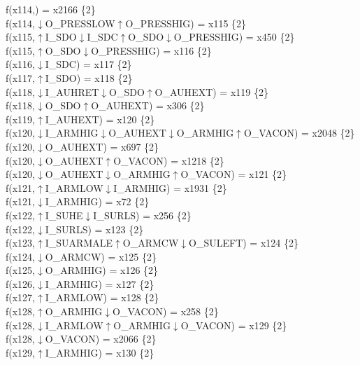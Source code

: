 f(x114,) = x2166 \{2\} \\  
f(x114,$\downarrow$O\_PRESSLOW$\uparrow$O\_PRESSHIG) = x115 \{2\} \\  
f(x115,$\uparrow$I\_SDO$\downarrow$I\_SDC$\uparrow$O\_SDO$\downarrow$O\_PRESSHIG) = x450 \{2\} \\  
f(x115,$\uparrow$O\_SDO$\downarrow$O\_PRESSHIG) = x116 \{2\} \\  
f(x116,$\downarrow$I\_SDC) = x117 \{2\} \\  
f(x117,$\uparrow$I\_SDO) = x118 \{2\} \\  
f(x118,$\downarrow$I\_AUHRET$\downarrow$O\_SDO$\uparrow$O\_AUHEXT) = x119 \{2\} \\  
f(x118,$\downarrow$O\_SDO$\uparrow$O\_AUHEXT) = x306 \{2\} \\  
f(x119,$\uparrow$I\_AUHEXT) = x120 \{2\} \\  
f(x120,$\downarrow$I\_ARMHIG$\downarrow$O\_AUHEXT$\downarrow$O\_ARMHIG$\uparrow$O\_VACON) = x2048 \{2\} \\  
f(x120,$\downarrow$O\_AUHEXT) = x697 \{2\} \\  
f(x120,$\downarrow$O\_AUHEXT$\uparrow$O\_VACON) = x1218 \{2\} \\  
f(x120,$\downarrow$O\_AUHEXT$\downarrow$O\_ARMHIG$\uparrow$O\_VACON) = x121 \{2\} \\  
f(x121,$\uparrow$I\_ARMLOW$\downarrow$I\_ARMHIG) = x1931 \{2\} \\  
f(x121,$\downarrow$I\_ARMHIG) = x72 \{2\} \\  
f(x122,$\uparrow$I\_SUHE$\downarrow$I\_SURLS) = x256 \{2\} \\  
f(x122,$\downarrow$I\_SURLS) = x123 \{2\} \\  
f(x123,$\uparrow$I\_SUARMALE$\uparrow$O\_ARMCW$\downarrow$O\_SULEFT) = x124 \{2\} \\  
f(x124,$\downarrow$O\_ARMCW) = x125 \{2\} \\  
f(x125,$\downarrow$O\_ARMHIG) = x126 \{2\} \\  
f(x126,$\downarrow$I\_ARMHIG) = x127 \{2\} \\  
f(x127,$\uparrow$I\_ARMLOW) = x128 \{2\} \\  
f(x128,$\uparrow$O\_ARMHIG$\downarrow$O\_VACON) = x258 \{2\} \\  
f(x128,$\downarrow$I\_ARMLOW$\uparrow$O\_ARMHIG$\downarrow$O\_VACON) = x129 \{2\} \\  
f(x128,$\downarrow$O\_VACON) = x2066 \{2\} \\  
f(x129,$\uparrow$I\_ARMHIG) = x130 \{2\} \\  
